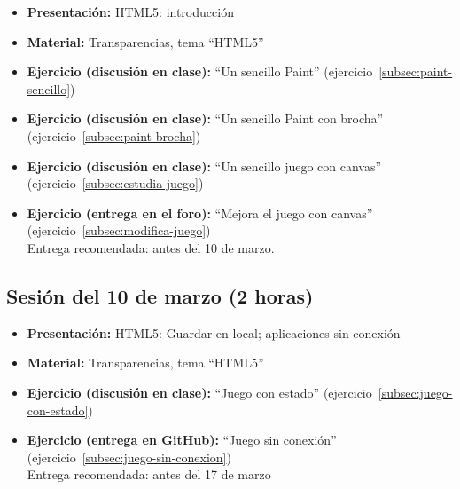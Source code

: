 \documentclass[a4paper,12pt]{report}
\begin{document}
\begin{itemize}
\item \textbf{Presentación:} HTML5: introducción
\item \textbf{Material:} Transparencias, tema ``HTML5''


\item \textbf{Ejercicio (discusión en clase):} ``Un sencillo Paint'' (ejercicio~\ref{subsec:paint-sencillo})
\item \textbf{Ejercicio (discusión en clase):} ``Un sencillo Paint con brocha'' (ejercicio~\ref{subsec:paint-brocha}) \\
 \item \textbf{Ejercicio (discusión en clase):} ``Un sencillo juego con canvas'' (ejercicio~\ref{subsec:estudia-juego})
 \item \textbf{Ejercicio (entrega en el foro):} ``Mejora el juego con canvas'' (ejercicio~\ref{subsec:modifica-juego}) \\
Entrega recomendada: antes del 10 de marzo.
\end{itemize}


\subsection{Sesión del 10 de marzo (2 horas)}

\begin{itemize}
 \item \textbf{Presentación:} HTML5: Guardar en local; aplicaciones sin conexión
 \item \textbf{Material:} Transparencias, tema ``HTML5''
 \item \textbf{Ejercicio (discusión en clase):} ``Juego con estado'' (ejercicio~\ref{subsec:juego-con-estado})
 \item \textbf{Ejercicio (entrega en GitHub):} ``Juego sin conexión'' (ejercicio~\ref{subsec:juego-sin-conexion}) \\
 Entrega recomendada: antes del 17 de marzo
 \end{itemize}
\end{document}
